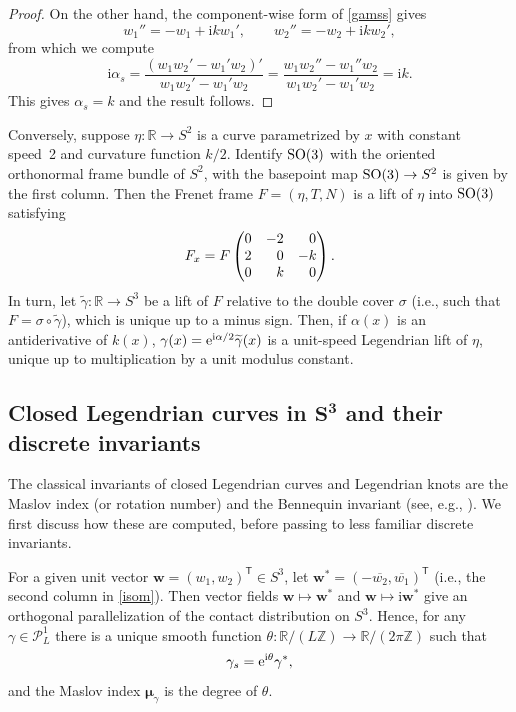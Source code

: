 \documentclass[10pt,a4paper]{amsart}
\newcommand\Legu{ {\mathcal P}^1} %
\newcommand\kk{k} %
\def\ri{\mathrm{i}}
\def\gam{\gamma} %
\def\R{\mathbb R}
\def\Z{\mathbb Z}
\newcommand\bw{\mathbf w}
\newcommand\gamt{\widetilde{\gam}}
\numberwithin{equation}{section}
\begin{document}
\begin{proof}
On the other hand, the component-wise form of \eqref{gamss} gives
\[
w_1''=-w_1+\ri\kk w_1', \qquad w_2''=-w_2+\ri\kk w_2',
\]
from which we compute
\[\ri \alpha_s = \frac{(w_1 w_2' - w_1' w_2)'}{ w_1 w_2' - w_1' w_2}=\frac{w_1 w_2'' - w_1'' w_2}{ w_1 w_2' - w_1' w_2} = \ri \kk.\]
This gives $\alpha_s=\kk$ and the result follows.
\end{proof}

\begin{Remark}\label{LiftingRemark}
Conversely, suppose $\eta\colon\R \to S^2$ is a curve parametrized by $x$ with constant speed~2 and curvature function $\kk/2$. Identify ${\rm SO}(3)$ with the oriented orthonormal frame bundle of $S^2$, with the basepoint map ${\rm SO}(3)\to S^2$ is given by the first column. Then the Frenet frame $F=(\eta, T, N)$ is a lift of $\eta$ into ${\rm SO}(3)$ satisfying
\[F_x = F \begin{pmatrix} 0 & -2 & \hphantom{-}0 \\ 2 & \hphantom{-}0 & -\kk \\ 0 & \hphantom{-}\kk & \hphantom{-}0 \end{pmatrix}.\]
In turn, let $\gamt\colon\R \to S^3$ be a lift of $F$ relative to the double cover $\sigma$ \big(i.e., such that $F = \sigma\circ \gamt$\big), which is unique
up to a minus sign. Then, if $\alpha(x)$ is an antiderivative of $\kk(x)$,
$\gam(x) = {\rm e}^{\ri \alpha/2} \gamt(x)$ is a unit-speed Legendrian lift of $\eta$, unique up to multiplication by a unit modulus constant.
\end{Remark}

\subsection[Closed Legendrian curves in S\^{}3 and their discrete invariants]{Closed Legendrian curves in $\boldsymbol{S^3}$ and their discrete invariants}

The classical invariants of closed Legendrian curves and Legendrian knots are the Maslov index (or rotation number) and the Bennequin invariant (see, e.g., \cite{ET1}).
We first discuss how these are computed, before passing to less familiar discrete invariants.

For a given unit vector $\bw = (w_1, w_2)^{\mathsf{T}} \in S^3$, let $\bw^* = (-\overline{w_2}, \overline{w_1})^{\mathsf{T}}$ (i.e., the second column in \eqref{isom}).
 Then vector fields $\bw \mapsto \bw^*$ and $\bw \mapsto \ri \bw^*$ give an orthogonal parallelization of the contact distribution on $S^3$.
Hence, for any $\gam \in \Legu_L$ there is a unique smooth function $\theta\colon\R/(L\Z)\to \R/(2\pi\Z)$ such that
\begin{equation}\label{Masloveq}
\gam_s={\rm e}^{\ri\theta}\gam^*,
\end{equation}
and the Maslov index ${\boldsymbol{\mu}}_{\gamma}$ is the degree of $\theta$.
\end{document}
